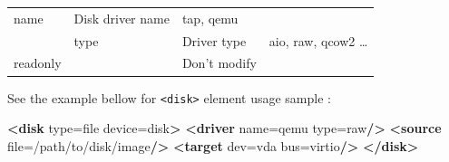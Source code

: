 \documentclass[
  14pt,
  english,
  a4paper,
]{scrreprt}
\newenvironment{Shaded}{}{}
\newcommand{\KeywordTok}[1]{\textcolor[rgb]{0.00,0.44,0.13}{\textbf{#1}}}
\newcommand{\OtherTok}[1]{\textcolor[rgb]{0.00,0.44,0.13}{#1}}
\newcommand{\StringTok}[1]{\textcolor[rgb]{0.25,0.44,0.63}{#1}}
\begin{document}
\begin{longtable}[]{@{}llll@{}}
\begin{minipage}[t]{0.14\columnwidth}
name\strut
\end{minipage} & \begin{minipage}[t]{0.31\columnwidth}\raggedright
Disk driver name\strut
\end{minipage} & \begin{minipage}[t]{0.28\columnwidth}\raggedright
tap, qemu\strut
\end{minipage}\tabularnewline
\begin{minipage}[t]{0.16\columnwidth}\raggedright
\strut
\end{minipage} & \begin{minipage}[t]{0.14\columnwidth}\raggedright
type\strut
\end{minipage} & \begin{minipage}[t]{0.31\columnwidth}\raggedright
Driver type\strut
\end{minipage} & \begin{minipage}[t]{0.28\columnwidth}\raggedright
aio, raw, qcow2 \ldots{}\strut
\end{minipage}\tabularnewline
\begin{minipage}[t]{0.16\columnwidth}\raggedright
readonly\strut
\end{minipage} & \begin{minipage}[t]{0.14\columnwidth}\raggedright
\strut
\end{minipage} & \begin{minipage}[t]{0.31\columnwidth}\raggedright
Don't modify\strut
\end{minipage} & \begin{minipage}[t]{0.28\columnwidth}\raggedright
\strut
\end{minipage}\tabularnewline
\bottomrule
\end{longtable}

See the example bellow for \texttt{\textless{}disk\textgreater{}}
element usage sample :

\begin{Shaded}
\begin{Highlighting}[]
\KeywordTok{\textless{}disk}\OtherTok{ type=}\StringTok{\textquotesingle{}file\textquotesingle{}}\OtherTok{ device=}\StringTok{\textquotesingle{}disk\textquotesingle{}}\KeywordTok{\textgreater{}}
  \KeywordTok{\textless{}driver}\OtherTok{ name=}\StringTok{\textquotesingle{}qemu\textquotesingle{}}\OtherTok{ type=}\StringTok{\textquotesingle{}raw\textquotesingle{}}\KeywordTok{/\textgreater{}}
  \KeywordTok{\textless{}source}\OtherTok{ file=}\StringTok{\textquotesingle{}/path/to/disk/image\textquotesingle{}}\KeywordTok{/\textgreater{}}
  \KeywordTok{\textless{}target}\OtherTok{ dev=}\StringTok{\textquotesingle{}vda\textquotesingle{}}\OtherTok{ bus=}\StringTok{\textquotesingle{}virtio\textquotesingle{}}\KeywordTok{/\textgreater{}}
\KeywordTok{\textless{}/disk\textgreater{}}
\end{Highlighting}
\end{Shaded}
\end{document}
